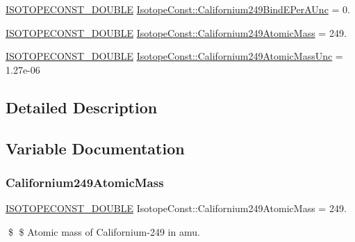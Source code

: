 \begin{DoxyCompactItemize}
\item 
\mbox{\hyperlink{group___isotope_const-_macros_ga8f45a7272ce02c0b4c65c44636ed719a}{I\+S\+O\+T\+O\+P\+E\+C\+O\+N\+S\+T\+\_\+\+D\+O\+U\+B\+LE}} \mbox{\hyperlink{group___isotope_const-_californium-_cf249_gafdbdb3c66273cc923abcbab497675092}{Isotope\+Const\+::\+Californium249\+Bind\+E\+Per\+A\+Unc}} = 0.
\item 
\mbox{\hyperlink{group___isotope_const-_macros_ga8f45a7272ce02c0b4c65c44636ed719a}{I\+S\+O\+T\+O\+P\+E\+C\+O\+N\+S\+T\+\_\+\+D\+O\+U\+B\+LE}} \mbox{\hyperlink{group___isotope_const-_californium-_cf249_ga03c2a889da2c5a6601a7d625f38ae836}{Isotope\+Const\+::\+Californium249\+Atomic\+Mass}} = 249.
\item 
\mbox{\hyperlink{group___isotope_const-_macros_ga8f45a7272ce02c0b4c65c44636ed719a}{I\+S\+O\+T\+O\+P\+E\+C\+O\+N\+S\+T\+\_\+\+D\+O\+U\+B\+LE}} \mbox{\hyperlink{group___isotope_const-_californium-_cf249_gabfacb27d835c35142a17787a9d2ee030}{Isotope\+Const\+::\+Californium249\+Atomic\+Mass\+Unc}} = 1.\+27e-\/06
\end{DoxyCompactItemize}


\subsection{Detailed Description}


\subsection{Variable Documentation}
\mbox{\label{group___isotope_const-_californium-_cf249_ga03c2a889da2c5a6601a7d625f38ae836}} 
\subsubsection{\texorpdfstring{Californium249\+Atomic\+Mass}{Californium249AtomicMass}}
{\footnotesize\ttfamily \mbox{\hyperlink{group___isotope_const-_macros_ga8f45a7272ce02c0b4c65c44636ed719a}{I\+S\+O\+T\+O\+P\+E\+C\+O\+N\+S\+T\+\_\+\+D\+O\+U\+B\+LE}} Isotope\+Const\+::\+Californium249\+Atomic\+Mass = 249.}

\$ \$ Atomic mass of Californium-\/249 in amu. \mbox{\label{group___isotope_const-_californium-_cf249_gabfacb27d835c35142a17787a9d2ee030}} 
